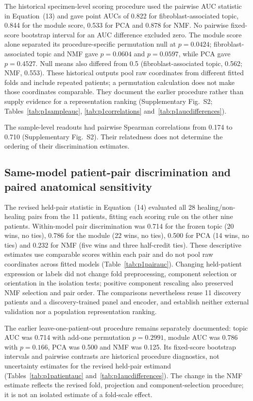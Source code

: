 \documentclass[10pt,a4paper]{article}
\begin{document}
The historical specimen-level scoring procedure used the pairwise AUC statistic in Equation~(13) and gave point AUCs of 0.822 for fibroblast-associated topic, 0.844 for the module score, 0.533 for PCA and 0.878 for NMF. No pairwise fixed-score bootstrap interval for an AUC difference excluded zero. The module score alone separated its procedure-specific permutation null at $p=0.0424$; fibroblast-associated topic and NMF gave $p=0.0604$ and $p=0.0597$, while PCA gave $p=0.4527$. Null means also differed from 0.5 (fibroblast-associated topic, 0.562; NMF, 0.553). These historical outputs pool raw coordinates from different fitted folds and include repeated patients; a permutation calculation does not make those coordinates comparable. They document the earlier procedure rather than supply evidence for a representation ranking (Supplementary Fig.~S2\label{call:p1f7}; Tables~\ref{tab:p1sampleauc}, \ref{tab:p1correlations} and~\ref{tab:p1aucdifferences}).

The sample-level readouts had pairwise Spearman correlations from 0.174 to 0.710 (Supplementary Fig.~S2). Their relatedness does not determine the ordering of their discrimination estimates.




\subsection{Same-model patient-pair discrimination and paired anatomical sensitivity}

The revised held-pair statistic in Equation~(14) evaluated all 28 healing/non-healing pairs from the 11 patients, fitting each scoring rule on the other nine patients. Within-model pair discrimination was 0.714 for the frozen topic (20 wins, no ties), 0.786 for the module (22 wins, no ties), 0.500 for PCA (14 wins, no ties) and 0.232 for NMF (five wins and three half-credit ties). These descriptive estimates use comparable scores within each pair and do not pool raw coordinates across fitted models (Table~\ref{tab:p1pairauc}). Changing held-patient expression or labels did not change fold preprocessing, component selection or orientation in the isolation tests; positive component rescaling also preserved NMF selection and pair order. The comparisons nevertheless reuse 11 discovery patients and a discovery-trained panel and encoder, and establish neither external validation nor a population representation ranking.

The earlier leave-one-patient-out procedure remains separately documented: topic AUC was 0.714 with add-one permutation $p=0.2991$, module AUC was 0.786 with $p=0.166$, PCA was 0.500 and NMF was 0.125. Its fixed-score bootstrap intervals and pairwise contrasts are historical procedure diagnostics, not uncertainty estimates for the revised held-pair estimand (Tables~\ref{tab:p1patientauc} and~\ref{tab:p1aucdifferences}). The change in the NMF estimate reflects the revised fold, projection and component-selection procedure; it is not an isolated estimate of a fold-scale effect.
\end{document}
